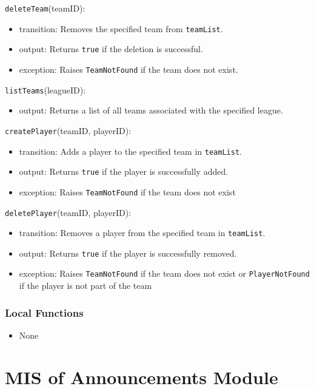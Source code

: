 \documentclass[12pt, titlepage]{article}
\begin{document}
\noindent \texttt{deleteTeam}(teamID):
\begin{itemize}
  \item transition: Removes the specified team from \texttt{teamList}.
  \item output: Returns \texttt{true} if the deletion is successful.
  \item exception: Raises \texttt{TeamNotFound} if the team does not exist.
\end{itemize}

\noindent \texttt{listTeams}(leagueID):
\begin{itemize}
  \item output: Returns a list of all teams associated with the specified league.
\end{itemize}

\noindent \texttt{createPlayer}(teamID, playerID):
\begin{itemize}
  \item transition: Adds a player to the specified team in \texttt{teamList}.
  \item output: Returns \texttt{true} if the player is successfully added.
  \item exception: Raises \texttt{TeamNotFound} if the team does not exist
\end{itemize}

\noindent \texttt{deletePlayer}(teamID, playerID):
\begin{itemize}
  \item transition: Removes a player from the specified team in \texttt{teamList}.
  \item output: Returns \texttt{true} if the player is successfully removed.
  \item exception: Raises \texttt{TeamNotFound} if the team does not exist or \texttt{PlayerNotFound} if the player is not part of the team
\end{itemize}

\subsubsection{Local Functions}
\begin{itemize}
  \item None
\end{itemize}

\section{MIS of Announcements Module} \label{AnnouncementsModule}
\end{document}
